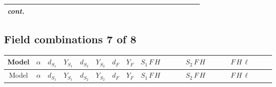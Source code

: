 \documentclass[8pt]{article}
\begin{document}
\begin{landscape}
\begin{longtable}{@{}cccccccc >{\raggedright\arraybackslash}p{0.21\linewidth} >{\raggedright\arraybackslash}p{0.21\linewidth} >{\raggedright\arraybackslash}p{0.21\linewidth}@{}}
\textit{cont.} &  &  &  &  &  &  &  &  &  & \scriptsize\adjustbox{max width=\linewidth}{$\begin{gathered} +\frac{\hbar  \overline{L_{a_1,i_1}}\, C\, P_R\, \overline{L_{a_2,i_2}}{}^T S_{1,j_2} y_{1,i_1,r_1} y_{2,i_2,r_1} {\mathcal{I}_{LLS_1S_2}}^{*}_{a_1,a_2,j_1,j_2} S_{2,j_1}{}^{\dagger } \lambda_{12}^{(1)}^{(2)}}{\sqrt{3} M_F}\end{gathered}$} \\
\midrule
\bottomrule
\end{longtable}
\clearpage
\subsection*{Field combinations 7 of 8}
\begin{longtable}{@{}cccccccc >{\raggedright\arraybackslash}p{0.21\linewidth} >{\raggedright\arraybackslash}p{0.21\linewidth} >{\raggedright\arraybackslash}p{0.21\linewidth}@{}}
\toprule
Model & $\alpha$ & $d_{S_1}$ & $Y_{S_1}$ & $d_{S_2}$ & $Y_{S_2}$ & $d_F$ & $Y_F$ & $S_1\,F\,H$ & $S_2\,F\,H$ & $F\,H\,\ell$ \\
\midrule
\endfirsthead
\toprule
Model & $\alpha$ & $d_{S_1}$ & $Y_{S_1}$ & $d_{S_2}$ & $Y_{S_2}$ & $d_F$ & $Y_F$ & $S_1\,F\,H$ & $S_2\,F\,H$ & $F\,H\,\ell$ \\
\midrule
\endhead

\end{longtable}
\end{landscape}
\end{document}
